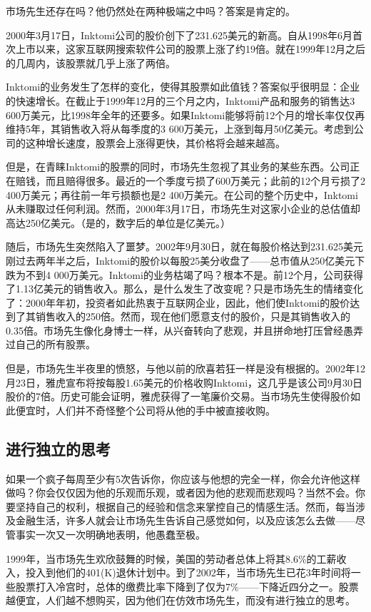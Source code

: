 \documentclass[12pt,oneside]{book}
\begin{document}
市场先生还存在吗？他仍然处在两种极端之中吗？答案是肯定的。

2000年3月17日，Inktomi公司的股价创下了231.625美元的新高。自从1998年6月首次上市以来，这家互联网搜索软件公司的股票上涨了约19倍。就在1999年12月之后的几周内，该股票就几乎上涨了两倍。

Inktomi的业务发生了怎样的变化，使得其股票如此值钱？答案似乎很明显：企业的快速增长。在截止于1999年12月的三个月之内，Inktomi产品和服务的销售达3 600万美元，比1998年全年的还要多。如果Inktomi能够将前12个月的增长率仅仅再维持5年，其销售收入将从每季度的3 600万美元，上涨到每月50亿美元。考虑到公司的这种增长速度，股票会上涨得更快，其价格将会越来越高。

但是，在青睐Inktomi的股票的同时，市场先生忽视了其业务的某些东西。公司正在赔钱，而且赔得很多。最近的一个季度亏损了600万美元；此前的12个月亏损了2 400万美元；再往前一年亏损额也是2 400万美元。在公司的整个历史中，Inktomi从未赚取过任何利润。然而，2000年3月17日，市场先生对这家小企业的总估值却高达250亿美元。（是的，数字后的单位是亿美元。）

随后，市场先生突然陷入了噩梦。2002年9月30日，就在每股价格达到231.625美元刚过去两年半之后，Inktomi的股价以每股25美分收盘了——总市值从250亿美元下跌为不到4 000万美元。Inktomi的业务枯竭了吗？根本不是。前12个月，公司获得了1.13亿美元的销售收入。那么，是什么发生了改变呢？只是市场先生的情绪变化了：2000年年初，投资者如此热衷于互联网企业，因此，他们使Inktomi的股价达到了其销售收入的250倍。然而，现在他们愿意支付的股价，只是其销售收入的0.35倍。市场先生像化身博士一样，从兴奋转向了悲观，并且拼命地打压曾经愚弄过自己的所有股票。

但是，市场先生半夜里的愤怒，与他以前的欣喜若狂一样是没有根据的。2002年12月23日，雅虎宣布将按每股1.65美元的价格收购Inktomi，这几乎是该公司9月30日股价的7倍。历史可能会证明，雅虎获得了一笔廉价交易。当市场先生使得股价如此便宜时，人们并不奇怪整个公司将从他的手中被直接收购。

\subsection{进行独立的思考}
如果一个疯子每周至少有5次告诉你，你应该与他想的完全一样，你会允许他这样做吗？你会仅仅因为他的乐观而乐观，或者因为他的悲观而悲观吗？当然不会。你要坚持自己的权利，根据自己的经验和信念来掌控自己的情感生活。然而，每当涉及金融生活，许多人就会让市场先生告诉自己感觉如何，以及应该怎么去做——尽管事实一次又一次明确地表明，他愚蠢至极。

1999年，当市场先生欢欣鼓舞的时候，美国的劳动者总体上将其8.6\%的工薪收入，投入到他们的401(K)退休计划中。到了2002年，当市场先生已花3年时间将一些股票打入冷宫时，总体的缴费比率下降到了仅为7\%——下降近四分之一。股票越便宜，人们越不想购买，因为他们在仿效市场先生，而没有进行独立的思考。
\end{document}
